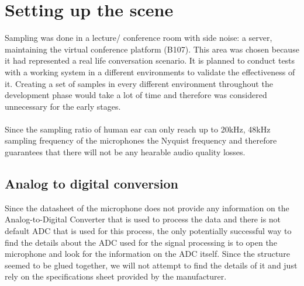 
\section{Setting up the scene}
Sampling was done in a lecture/ conference room with side noise: a server, maintaining the virtual conference platform (B107). This area was chosen because it had represented a real life conversation scenario. It is planned to conduct tests with a working system in a different environments to validate the effectiveness of it. Creating a set of samples in every different environment throughout the development phase would take a lot of time and therefore was considered unnecessary for the early stages. 
\paragraph{}
Since the sampling ratio of human ear can only reach up to 20kHz, 48kHz sampling frequency of the microphones the Nyquist frequency and therefore guarantees that there will not be any hearable audio quality losses.   
\subsection{Analog to digital conversion}
Since the datasheet of the microphone does not provide any information on the Analog-to-Digital Converter that is used to process the data and there is not default ADC that is used for this process, the only potentially successful way to find the details about the ADC used for the signal processing is to open the microphone and look for the information on the ADC itself. Since the structure seemed to be glued together, we will not attempt to find the details of it and just rely on the specifications sheet provided by the manufacturer.  

 

